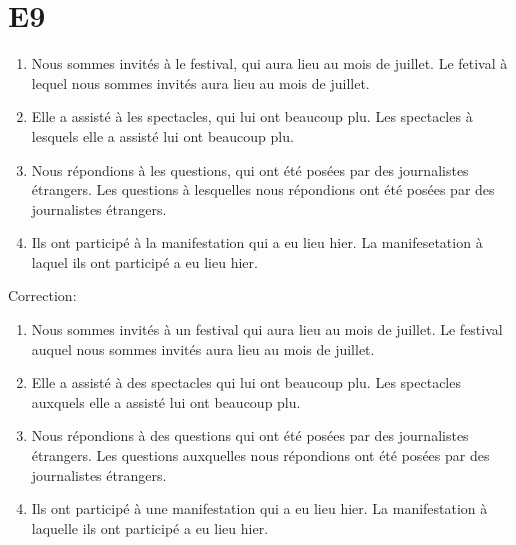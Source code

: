 \documentclass{book}
\begin{document}
    \section{E9}
        \begin{enumerate}
            \item Nous sommes invités à le festival, qui aura lieu au mois de juillet. Le fetival à lequel nous sommes invités aura lieu au mois de juillet.
            \item Elle a assisté à les spectacles, qui lui ont beaucoup plu. Les spectacles à lesquels elle a assisté lui ont beaucoup plu.
            \item Nous répondions à les questions, qui ont été posées par des journalistes étrangers. Les questions à lesquelles nous répondions ont été posées par des journalistes étrangers.
            \item Ils ont participé à la manifestation qui a eu lieu hier. La manifesetation à laquel ils ont participé a eu lieu hier.
        \end{enumerate}
        Correction:
        \begin{enumerate}
            \item 
            Nous sommes invités à un festival qui aura lieu au mois de juillet. 
            Le festival auquel nous sommes invités aura lieu au mois de juillet.

            \item 
            Elle a assisté à des spectacles qui lui ont beaucoup plu. 
            Les spectacles auxquels elle a assisté lui ont beaucoup plu.

            \item 
            Nous répondions à des questions qui ont été posées par des journalistes étrangers. 
            Les questions auxquelles nous répondions ont été posées par des journalistes étrangers.

            \item 
            Ils ont participé à une manifestation qui a eu lieu hier. 
            La manifestation à laquelle ils ont participé a eu lieu hier.
        \end{enumerate}
\end{document}
